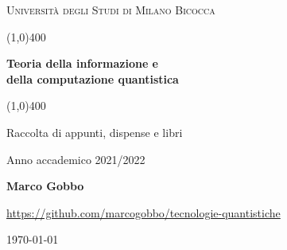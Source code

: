 \documentclass[a4paper, 12pt]{book}
\begin{document}
    \begin{titlepage}
        \begin{center}
            \vspace*{5cm}
            {\scshape\LARGE Università degli Studi di Milano Bicocca \par}
            \vspace{1.0cm}
            \line(1,0){400} \\
            {\huge\bfseries Teoria della informazione e \\ della computazione quantistica \par}
            \line(1,0){400} \\
 	        \vspace{0.5cm}
            {\Large Raccolta di appunti, dispense e libri \par}
            \vspace{1.0cm}
            {Anno accademico 2021/2022 \par}
            \vspace{0.5cm}
            {\bfseries Marco Gobbo \par}
            \vspace{0.5cm}
            {\url{https://github.com/marcogobbo/tecnologie-quantistiche} \par}
            \vspace*{\fill}
            {\large \today \par}
        \end{center}
    \end{titlepage}
\end{document}

